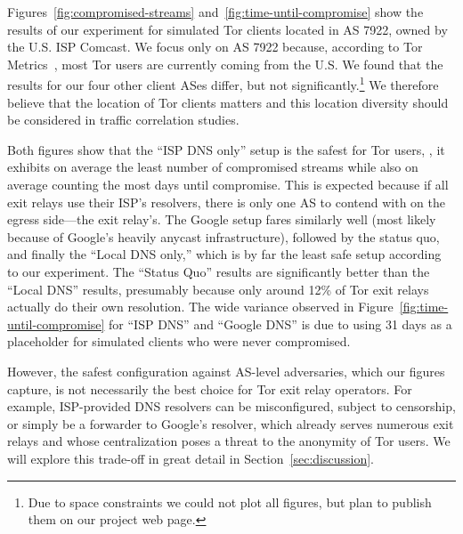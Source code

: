 Figures~\ref{fig:compromised-streams} and~\ref{fig:time-until-compromise} show
the results of our experiment for simulated Tor clients located in AS 7922,
owned by the U.S. ISP Comcast.  We focus only on AS 7922 because, according to Tor
Metrics~\cite{metrics-countries}, most Tor users are currently coming from the
U.S.  We found that the results for our four other client ASes differ, but not
significantly.\footnote{Due to space constraints we could not plot all figures,
but plan to publish them on our project web page.}  We therefore believe that
the location of Tor clients matters and this location diversity should be
considered in traffic correlation studies.

Both figures show that the ``ISP DNS only'' setup is the safest for Tor users,
\ie, it exhibits on average the least number of compromised streams while also
on average counting the most days until compromise.  This is expected because
if all exit relays use their ISP's resolvers, there is only one AS to contend
with on the egress side---the exit relay's.  The Google setup fares similarly
well (most likely because of Google's heavily anycast infrastructure), followed
by the status quo, and finally the ``Local DNS only,'' which is by far the
least safe setup according to our experiment.  The ``Status Quo'' results are
significantly better than the ``Local DNS'' results, presumably because only
around 12\% of Tor exit relays actually do their own resolution.  The wide
variance observed in Figure~\ref{fig:time-until-compromise} for ``ISP DNS'' and
``Google DNS'' is due to using 31 days as a placeholder for simulated clients
who were never compromised.

However, the safest configuration against AS-level adversaries, which our
figures capture, is not necessarily the best choice for Tor exit relay
operators.  For example, ISP-provided DNS resolvers can be misconfigured,
subject to censorship, or simply be a forwarder to Google's resolver, which
already serves numerous exit relays and whose centralization poses a threat to
the anonymity of Tor users.  We will explore this trade-off in great detail in
Section~\ref{sec:discussion}.
